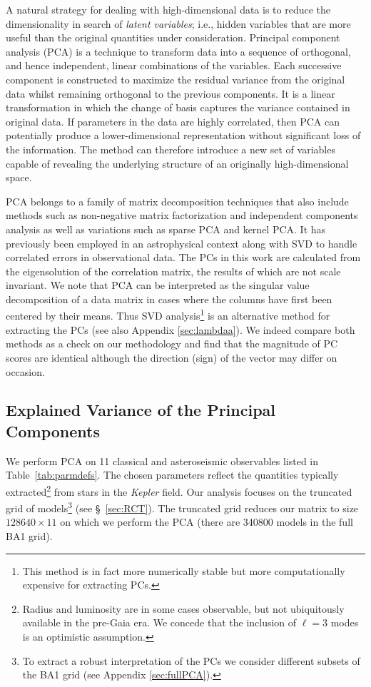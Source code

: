 A natural strategy for dealing with high-dimensional data is to reduce the dimensionality in search of \emph{latent variables}; i.e., hidden variables that are more useful than the original quantities under consideration. 
Principal component analysis (PCA) is a technique to transform data into a sequence of orthogonal, and hence independent,  linear combinations of the variables.
Each successive component is constructed to maximize the residual variance from the original data whilst remaining orthogonal to the previous components.
It is a linear transformation in which the change of basis captures the variance contained in original data. 
If parameters in the data are highly correlated, then PCA can potentially produce a lower-dimensional representation without significant loss of the information. 
The method can therefore introduce a new set of variables capable of revealing the underlying structure of an originally high-dimensional space.

 

PCA  belongs to a family of matrix decomposition techniques that also include methods such as non-negative matrix factorization and independent components analysis as well as variations such as sparse PCA and kernel PCA. 
It has previously been employed in an astrophysical context \citep{2008ApJ...686.1349B, 1987ASSL..131.....M} along with SVD \citep{1994ApJ...427.1013B, 2009ApJ...699..373M} to handle correlated errors in observational data. 
The PCs in this work are calculated from the eigensolution of the correlation matrix, the results of which are not scale invariant. 
We note that PCA can be interpreted as the singular value decomposition of a data matrix in cases where the columns have first been centered by their means. 
Thus SVD analysis\footnote{This method is in fact more numerically stable but more computationally expensive for extracting PCs.} is an alternative method for extracting the PCs (see also Appendix \ref{sec:lambdaa}). 
We indeed compare both methods as a check on our methodology and find that the magnitude of PC scores are identical although the direction (sign) of the vector may differ on occasion.





\subsection{Explained Variance of the Principal Components}
\label{sec:ev}
We perform PCA on 11 classical and asteroseismic observables listed in Table~\ref{tab:parmdefs}.
The chosen parameters reflect the quantities typically  extracted\footnote{Radius and luminosity are in some cases observable, but not ubiquitously available in the pre-Gaia era. We concede that the inclusion of $\ell=3$ modes is an optimistic assumption.} from stars in the \emph{Kepler} \citep{2004SPIE.5487.1491K,2010Sci...327..977B} field.
Our analysis focuses on the  truncated grid of models\footnote{To extract a robust interpretation of the PCs we consider different subsets of the BA1 grid (see Appendix \ref{sec:fullPCA}).} (see \S~\ref{sec:RCT}).
The truncated grid reduces our matrix to size $ 128640 \times 11$ on which we perform the PCA (there are 340800 models in the full BA1 grid). 

